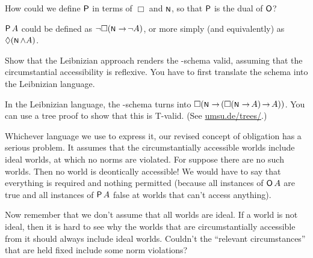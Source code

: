 \begin{exercise}
  How could we define $\operatorname{\mathsf{P}}$ in terms of $\Box$ and $\OK$, so that $\operatorname{\mathsf{P}}$ is the
  dual of $\operatorname{\mathsf{O}}$? 
\end{exercise}
\begin{solution}
  $\operatorname{\mathsf{P}} A$ could be defined as $\neg\Box(\OK \to \neg A)$, or more simply (and
  equivalently) as $\Diamond (\OK \land A)$.
\end{solution}

\begin{exercise}
  Show that the Leibnizian approach renders the -schema valid, assuming
  that the circumstantial accessibility is reflexive. You have to first
  translate the schema into the Leibnizian language.
\end{exercise}
\begin{solution}
  In the Leibnizian language, the -schema turns into
  $\Box(\OK \to (\Box(\OK \to A) \to A))$. You can use a tree proof to show that
  this is T-valid. (See \href{https://www.umsu.de/trees/}{umsu.de/trees/}.)

\end{solution}


Whichever language we use to express it, our revised concept of obligation has a
serious problem. It assumes that the circumstantially accessible worlds include
ideal worlds, at which no norms are violated. For suppose there are no such
worlds. Then no world is deontically accessible! We would have to say that
everything is required and nothing permitted (because all instances of $\operatorname{\mathsf{O}} A$
are true and all instances of $\operatorname{\mathsf{P}} A$ false at worlds that can't access
anything).

Now remember that we don't assume that all worlds are ideal. If a world is not
ideal, then it is hard to see why the worlds that are circumstantially
accessible from it should always include ideal worlds. Couldn't the ``relevant
circumstances'' that are held fixed include some norm violations?

